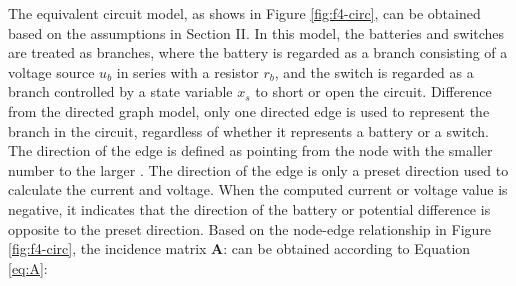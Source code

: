 \documentclass{article}
\begin{document}
The equivalent circuit model, as shows in Figure \ref{fig:f4-circ}, can be obtained based on the assumptions in Section II.
In this model, the batteries and switches are treated as branches, where the battery is regarded as a branch consisting of a voltage source $u_b$ in series with a resistor $r_b$, and the switch is regarded as a branch controlled by a state variable $x_s$ to short or open the circuit.
Difference from the directed graph model, only one directed edge is used to represent the branch in the circuit, regardless of whether it represents a battery or a switch.
The direction of the edge is defined as pointing from the node with the smaller number to the  larger .
The direction of the edge is only a preset direction used to calculate the current and voltage.
When the computed current or voltage value is negative, it indicates that the direction of the battery or potential difference is opposite to the preset direction.
Based on the node-edge relationship in Figure \ref{fig:f4-circ}, the incidence matrix $\bm{A}$: can be obtained according to Equation \ref{eq:A}:
\end{document}
